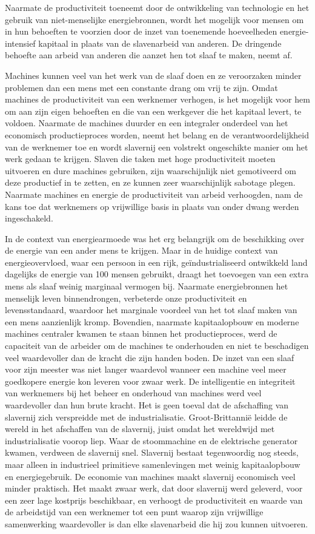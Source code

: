 \documentclass[
  a5paper,
  smalldemyvopaper,11pt,twoside,onecolumn,openright,extrafontsizes,
hidelinks]{memoir}
\begin{document}
Naarmate de productiviteit toeneemt door de ontwikkeling van technologie
en het gebruik van niet-menselijke energiebronnen, wordt het mogelijk
voor mensen om in hun behoeften te voorzien door de inzet van toenemende
hoeveelheden energie-intensief kapitaal in plaats van de slavenarbeid
van anderen. De dringende behoefte aan arbeid van anderen die aanzet hen
tot slaaf te maken, neemt af.

Machines kunnen veel van het werk van de slaaf doen en ze veroorzaken
minder problemen dan een mens met een constante drang om vrij te zijn.
Omdat machines de productiviteit van een werknemer verhogen, is het
mogelijk voor hem om aan zijn eigen behoeften en die van een werkgever
die het kapitaal levert, te voldoen. Naarmate de machines duurder en een
integraler onderdeel van het economisch productieproces worden, neemt
het belang en de verantwoordelijkheid van de werknemer toe en wordt
slavernij een volstrekt ongeschikte manier om het werk gedaan te
krijgen. Slaven die taken met hoge productiviteit moeten uitvoeren en
dure machines gebruiken, zijn waarschijnlijk niet gemotiveerd om deze
productief in te zetten, en ze kunnen zeer waarschijnlijk sabotage
plegen. Naarmate machines en energie de productiviteit van arbeid
verhoogden, nam de kans toe dat werknemers op vrijwillige basis in
plaats van onder dwang werden ingeschakeld.

In de context van energiearmoede was het erg belangrijk om de
beschikking over de energie van een ander mens te krijgen. Maar in de
huidige context van energieovervloed, waar een persoon in een rijk,
geïndustrialiseerd ontwikkeld land dagelijks de energie van 100 mensen
gebruikt, draagt het toevoegen van een extra mens als slaaf weinig
marginaal vermogen bij. Naarmate energiebronnen het menselijk leven
binnendrongen, verbeterde onze productiviteit en levensstandaard,
waardoor het marginale voordeel van het tot slaaf maken van een mens
aanzienlijk kromp. Bovendien, naarmate kapitaalopbouw en moderne
machines centraler kwamen te staan binnen het productieproces, werd de
capaciteit van de arbeider om de machines te onderhouden en niet te
beschadigen veel waardevoller dan de kracht die zijn handen boden. De
inzet van een slaaf voor zijn meester was niet langer waardevol wanneer
een machine veel meer goedkopere energie kon leveren voor zwaar werk. De
intelligentie en integriteit van werknemers bij het beheer en onderhoud
van machines werd veel waardevoller dan hun brute kracht. Het is geen
toeval dat de afschaffing van slavernij zich verspreidde met de
industrialisatie. Groot-Brittannië leidde de wereld in het afschaffen
van de slavernij, juist omdat het wereldwijd met industrialisatie voorop
liep. Waar de stoommachine en de elektrische generator kwamen, verdween
de slavernij snel. Slavernij bestaat tegenwoordig nog steeds, maar
alleen in industrieel primitieve samenlevingen met weinig kapitaalopbouw
en energiegebruik. De economie van machines maakt slavernij economisch
veel minder praktisch. Het maakt zwaar werk, dat door slavernij werd
geleverd, voor een zeer lage kostprijs beschikbaar, en verhoogt de
productiviteit en waarde van de arbeidstijd van een werknemer tot een
punt waarop zijn vrijwillige samenwerking waardevoller is dan elke
slavenarbeid die hij zou kunnen uitvoeren.
\end{document}
